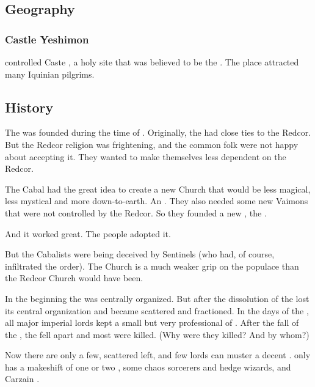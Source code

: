 \subsection{Geography}





\subsubsection{Castle Yeshimon}
\ClanZether controlled Caste , a holy site that was believed to be the . 
The place attracted many Iquinian pilgrims. 









\subsection{History}
The \vclan was founded during the time of . 
Originally, the \bacconate{} had close ties to the Redcor. 
But the Redcor religion was frightening, and the common folk were not happy about accepting it. 
They wanted to make themselves less dependent on the Redcor. 

The Cabal had the great idea to create a new \Iquinian{} Church that would be less magical, less mystical and more down-to-earth. 
An . 
They also needed some new Vaimons that were not controlled by the Redcor. 
So they founded a new \VaimonClan, the \Telcra. 

And it worked great. 
The people adopted it.

But the Cabalists were being deceived by Sentinels (who had, of course, infiltrated the order). 
The \Telcra{} Church is a much weaker grip on the populace than the Redcor Church would have been. 

In the beginning the \vclan was centrally organized. 
But after the dissolution of \Tepharae{} the \vclan lost its central organization and became scattered and fractioned. 
In the days of the \bacconate, all major imperial lords kept a small but very professional \ishrah{} of \Telcras. 
After the fall of the \bacconate, the \vclan fell apart and most were killed. 
(Why were they killed? And by whom?) 

Now there are only a few, scattered \Telcras{} left, and few lords can muster a decent \ishrah. \Malcur only has a makeshift \ishrah{} of one or two \Telcras, some chaos sorcerers and hedge wizards, and Carzain \Shireyo. 





